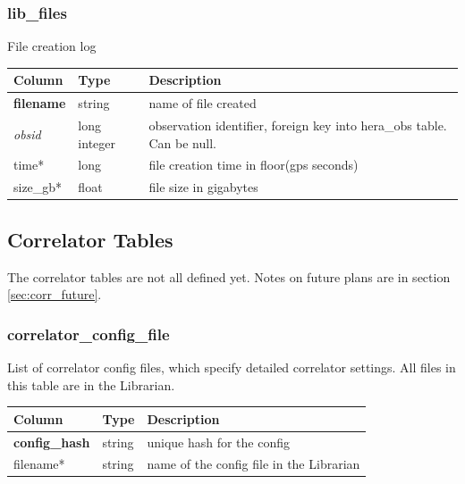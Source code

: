 \documentclass{article}
\begin{document}
{\subsubsection{lib\_files}
File creation log
\begin{center}
 \begin{tabular}{| p{4cm} | p{2cm} | p{10cm} |}
\hline
 {\bf Column} & {\bf Type}  & {\bf Description} \\ [0.5ex]  \hline\hline
\textbf{filename} & string & name of file created \\ \hline
\textit{obsid} & long integer & observation identifier, foreign key into hera\_obs table. Can be null. \\ \hline
time* & long & file creation time in floor(gps seconds)\\ \hline
size\_gb* & float & file size in gigabytes \\ \hline
\end{tabular}
\end{center}




\subsection{Correlator Tables}
The correlator tables are not all defined yet. Notes on future plans are in section \ref{sec:corr_future}.


\subsubsection{correlator\_config\_file}
List of correlator config files, which specify detailed correlator settings. All files in this table are in the Librarian.
\begin{center}
 \begin{tabular}{| p{4cm} | p{2cm} | p{10cm} |}
\hline
 {\bf Column} & {\bf Type}  & {\bf Description} \\ [0.5ex]  \hline\hline
\textbf{config\_hash} & string & unique hash for the config\\ \hline
filename* & string & name of the config file in the Librarian \\\hline
\end{tabular}
\end{center}

}
\end{document}
